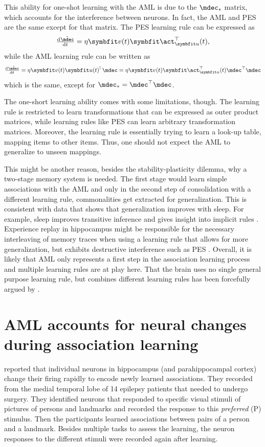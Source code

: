 This ability for one-shot learning with the AML is due to the $\mdec_*$ matrix, which accounts for the interference between neurons.
In fact, the AML and PES are the same except for that matrix.
The PES learning rule can be expressed as
\begin{equation}
    \od{\tilde{\mdec}}{t} = \eta \vc v(t) \vc\act_{\vc u}\Tr(t) \text{,}
\end{equation}
while the AML learning rule can be written as
\begin{equation}
    \od{\tilde{\mdec}}{t} = \eta \vc v(t) \vc u(t)\!\Tr \mdec = \eta \vc v(t) \vc\act_{\vc u}\Tr(t) \mdec\Tr \mdec
\end{equation}
which is the same, except for $\mdec_* = \mdec\Tr \mdec$.

The one-short learning ability comes with some limitations, though.
The learning rule is restricted to learn transformations that can be expressed as outer product matrices, while learning rules like PES can learn arbitrary transformation matrices.
Moreover, the learning rule is essentially trying to learn a look-up table, mapping items to other items.
Thus, one should not expect the AML to generalize to unseen mappings.

This might be another reason, besides the stability-plasticity dilemma, why a two-stage memory system is needed.
The first stage would learn simple associations with the AML and only in the second step of consolidation with a different learning rule, commonalities get extracted for generalization.
This is consistent with data that shows that generalization improves with sleep.
For example, sleep improves transitive inference \parencite{stickgold2013-2} and gives insight into implicit rules \parencite{wagner2004}.
Experience replay in hippocampus might be responsible for the necessary interleaving of memory traces when using a learning rule that allows for more generalization, but exhibits destructive interference such as PES \parencite{mcclelland1995-1,kumaran2016}.
Overall, it is likely that AML only represents a first step in the association learning process and multiple learning rules are at play here.
That the brain uses no single general purpose learning rule, but combines different learning rules has been forcefully argued by \textcite{gallistel2009}.


\section{AML accounts for neural changes during association learning}\label{sec:aml-neural}
\Textcite{ison2015} reported that individual neurons in hippocampus (and parahippocampal cortex) change their firing rapidly to encode newly learned associations.
They recorded from the medial temporal lobe of \num{14} epilepsy patients that needed to undergo surgery.
They identified neurons that responded to specific visual stimuli of pictures of persons and landmarks and recorded the response to this \emph{preferred} (P) stimulus.
Then the participants learned associations between pairs of a person and a landmark.
Besides multiple tasks to assess the learning, the neuron responses to the different stimuli were recorded again after learning.

